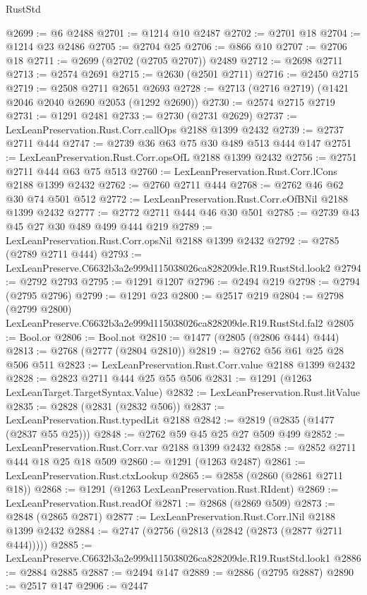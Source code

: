 \begin{lexlean}{RustStd}
\begin{coremodule}
@2699 := @6 @2488
@2701 := @1214 @10 @2487
@2702 := @2701 @18
@2704 := @1214 @23 @2486
@2705 := @2704 @25
@2706 := @866 @10
@2707 := @2706 @18
@2711 := @2699 (@2702 (@2705 @2707)) @2489
@2712 := @2698 @2711
@2713 := @2574 @2691
@2715 := @2630 (@2501 @2711)
@2716 := @2450 @2715
@2719 := @2508 @2711 @2651 @2693
@2728 := @2713 (@2716 @2719) (@1421 @2046 @2040 @2690 @2053 (@1292 @2690))
@2730 := @2574 @2715 @2719
@2731 := @1291 @2481
@2733 := @2730 (@2731 @2629)
@2737 := LexLeanPreservation.Rust.Corr.callOps @2188 @1399 @2432
@2739 := @2737 @2711 @444
@2747 := @2739 @36 @63 @75 @30 @489 @513 @444 @147
@2751 := LexLeanPreservation.Rust.Corr.opsOfL @2188 @1399 @2432
@2756 := @2751 @2711 @444 @63 @75 @513
@2760 := LexLeanPreservation.Rust.Corr.lCons @2188 @1399 @2432
@2762 := @2760 @2711 @444
@2768 := @2762 @46 @62 @30 @74 @501 @512
@2772 := LexLeanPreservation.Rust.Corr.eOfBNil @2188 @1399 @2432
@2777 := @2772 @2711 @444 @46 @30 @501
@2785 := @2739 @43 @45 @27 @30 @489 @499 @444 @219
@2789 := LexLeanPreservation.Rust.Corr.opsNil @2188 @1399 @2432
@2792 := @2785 (@2789 @2711 @444)
@2793 := LexLeanPreserve.C6632b3a2e999d115038026ca828209de.R19.RustStd.look2
@2794 := @2792 @2793
@2795 := @1291 @1207
@2796 := @2494 @219
@2798 := @2794 (@2795 @2796)
@2799 := @1291 @23
@2800 := @2517 @219
@2804 := @2798 (@2799 @2800) LexLeanPreserve.C6632b3a2e999d115038026ca828209de.R19.RustStd.fal2
@2805 := Bool.or
@2806 := Bool.not
@2810 := @1477 (@2805 (@2806 @444) @444)
@2813 := @2768 (@2777 (@2804 @2810))
@2819 := @2762 @56 @61 @25 @28 @506 @511
@2823 := LexLeanPreservation.Rust.Corr.value @2188 @1399 @2432
@2828 := @2823 @2711 @444 @25 @55 @506
@2831 := @1291 (@1263 LexLeanTarget.TargetSyntax.Value)
@2832 := LexLeanPreservation.Rust.litValue
@2835 := @2828 (@2831 (@2832 @506))
@2837 := LexLeanPreservation.Rust.typedLit @2188
@2842 := @2819 (@2835 (@1477 (@2837 @55 @25)))
@2848 := @2762 @59 @45 @25 @27 @509 @499
@2852 := LexLeanPreservation.Rust.Corr.var @2188 @1399 @2432
@2858 := @2852 @2711 @444 @18 @25 @18 @509
@2860 := @1291 (@1263 @2487)
@2861 := LexLeanPreservation.Rust.ctxLookup
@2865 := @2858 (@2860 (@2861 @2711 @18))
@2868 := @1291 (@1263 LexLeanPreservation.Rust.RIdent)
@2869 := LexLeanPreservation.Rust.readOf
@2871 := @2868 (@2869 @509)
@2873 := @2848 (@2865 @2871)
@2877 := LexLeanPreservation.Rust.Corr.lNil @2188 @1399 @2432
@2884 := @2747 (@2756 (@2813 (@2842 (@2873 (@2877 @2711 @444)))))
@2885 := LexLeanPreserve.C6632b3a2e999d115038026ca828209de.R19.RustStd.look1
@2886 := @2884 @2885
@2887 := @2494 @147
@2889 := @2886 (@2795 @2887)
@2890 := @2517 @147
@2906 := @2447

\end{coremodule}
\end{lexlean}
